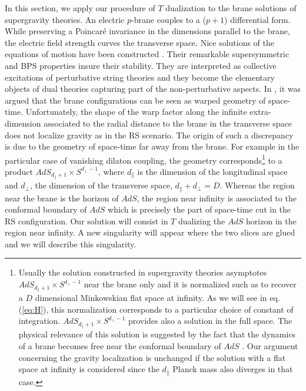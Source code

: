 \documentclass[a4paper,12pt]{article}
\def\dpar{d_{\scriptscriptstyle\parallel}}
\def\dperp{d_{\scriptscriptstyle\perp}}
\begin{document}
In this section, we apply our procedure of $T$ dualization to the
brane solutions of supergravity theories. An electric $p$-brane couples
to a ($p+1$) differential form. While preserving a Poincar\'e invariance
in the dimensions parallel to the brane, the electric field strength curves
the transverse space. Nice solutions of the equations of motion have been
constructed \cite{SugraBranes}. Their remarkable supersymmetric and BPS properties
insure their stability. They are interpreted as collective excitations
of perturbative string theories and they become the elementary objects of dual
theories capturing part of the non-perturbative aspects.
In \cite{CGS3}, it was argued that the brane configurations can be seen
as warped geometry of space-time. Unfortunately, the shape of the warp factor
along the infinite extra-dimension associated to the radial distance to the brane
in the transverse space does not localize gravity as in the RS scenario.
The origin of such a discrepancy is due to the geometry of space-time far away
from the brane. For example in the particular case of vanishing dilaton coupling,
the geometry corresponds\footnote{Usually the solution constructed in supergravity
theories asymptotes $AdS_{\dpar+1}\times S^{\dperp-1}$ near the brane only and it
is normalized such as to recover a $D$ dimensional Minkowskian flat space
at infinity. As we will see in eq. (\ref{eq:H}), this normalization corresponds
to a particular choice of constant of integration.
$AdS_{\dpar+1}\times S^{\dperp-1}$ provides also a solution in the full space.
The physical relevance of this solution is suggested by the fact that the
dynamics of a brane becomes free near the conformal boundary of $AdS$
\cite{GM}. Our argument concerning the gravity localization is unchanged
if the solution with a flat space at infinity is considered since the $\dpar$ Planck
mass also diverges in that case.}
to a product $AdS_{\dpar+1}\times S^{\dperp-1}$, where $\dpar$ is
the dimension of the longitudinal space and $\dperp$, the dimension of the transverse
space, $\dpar+\dperp=D$. Whereas the region near the brane is the horizon of $AdS$,
the region near infinity is associated to the conformal boundary of $AdS$ which
is precisely the part of space-time cut in the RS configuration.
Our solution will consist in $T$ dualizing the $AdS$ horizon in the region near
infinity. A new singularity will appear where the two slices are glued
and we will describe this singularity.
\end{document}
